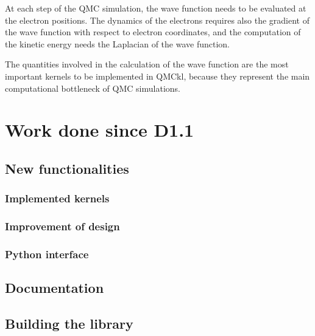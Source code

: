 At each step of the \ac{QMC} simulation, the wave function needs to be
evaluated at the electron positions. The dynamics of the electrons
requires also the gradient of the wave function with respect to electron
coordinates, and the computation of the kinetic energy needs the Laplacian
of the wave function.

The quantities involved in the calculation of the wave function are the most
important kernels to be implemented in QMCkl, because they represent the main
computational bottleneck of \ac{QMC} simulations.


\section{Work done since D1.1}

\subsection{New functionalities}

\subsubsection{Implemented kernels}

\subsubsection{Improvement of design}


\subsubsection{Python interface}


\subsection{Documentation}

\subsection{Building the library}

